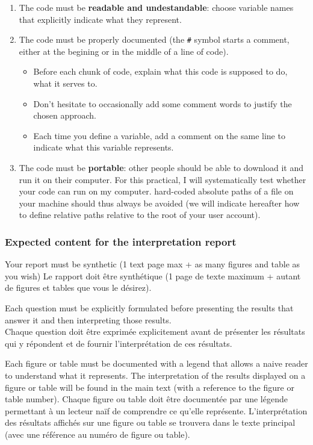 \documentclass[]{article}
\begin{document}
\begin{enumerate}
\def\labelenumi{\arabic{enumi}.}
\item
  The code must be \textbf{readable and undestandable}: choose variable
  names that explicitly indicate what they represent.
\item
  The code must be properly documented (the \texttt{\#} symbol starts a
  comment, either at the begining or in the middle of a line of code).

  \begin{itemize}
  \item
    Before each chunk of code, explain what this code is supposed to do,
    what it serves to.
  \item
    Don't hesitate to occasionally add some comment words to justify the
    chosen approach.
  \item
    Each time you define a variable, add a comment on the same line to
    indicate what this variable represents.
  \end{itemize}
\item
  The code must be \textbf{portable}: other people should be able to
  download it and run it on their computer. For this practical, I will
  systematically test whether your code can run on my computer.
  hard-coded absolute paths of a file on your machine should thus always
  be avoided (we will indicate hereafter how to define relative paths
  relative to the root of your user account).
\end{enumerate}

\subsubsection{Expected content for the interpretation
report}\label{expected-content-for-the-interpretation-report}

Your report must be synthetic (1 text page max + as many figures and
table as you wish) Le rapport doit être synthétique (1 page de texte
maximum + autant de figures et tables que vous le désirez).

Each question must be explicitly formulated before presenting the
results that answer it and then interpreting those results.\\
Chaque question doit être exprimée explicitement avant de présenter les
résultats qui y répondent et de fournir l'interprétation de ces
résultats.

Each figure or table must be documented with a legend that allows a
naive reader to understand what it represents. The interpretation of the
results displayed on a figure or table will be found in the main text
(with a reference to the figure or table number). Chaque figure ou table
doit être documentée par une légende permettant à un lecteur naïf de
comprendre ce qu'elle représente. L'interprétation des résultats
affichés sur une figure ou table se trouvera dans le texte principal
(avec une référence au numéro de figure ou table).
\end{document}
